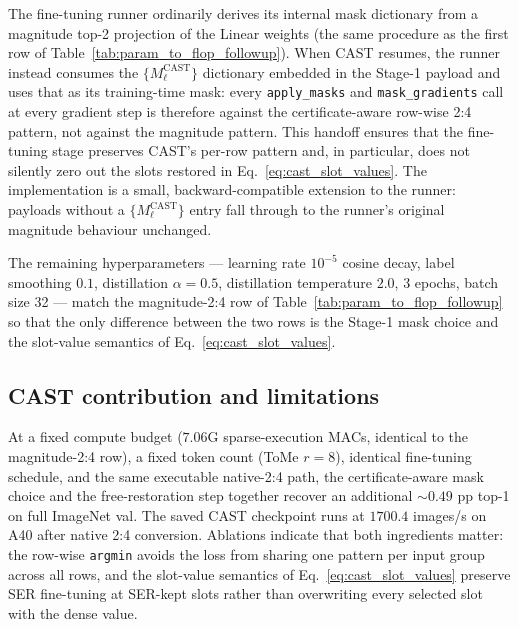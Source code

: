 \documentclass[11pt]{article}
\theoremstyle{plain}
\theoremstyle{definition}
\theoremstyle{remark}
\newcommand{\1}{\mathbf{1}}
\begin{document}
The fine-tuning runner ordinarily derives its internal mask dictionary from a magnitude top-2 projection of the Linear weights (the same procedure as the first row of Table~\ref{tab:param_to_flop_followup}).  When CAST resumes, the runner instead consumes the \(\{M^{\mathrm{CAST}}_\ell\}\) dictionary embedded in the Stage-1 payload and uses that as its training-time mask: every \texttt{apply\_masks} and \texttt{mask\_gradients} call at every gradient step is therefore against the certificate-aware row-wise 2:4 pattern, not against the magnitude pattern.  This handoff ensures that the fine-tuning stage preserves CAST's per-row pattern and, in particular, does not silently zero out the slots restored in Eq.~\eqref{eq:cast_slot_values}.  The implementation is a small, backward-compatible extension to the runner: payloads without a \(\{M^{\mathrm{CAST}}_\ell\}\) entry fall through to the runner's original magnitude behaviour unchanged.

The remaining hyperparameters --- learning rate \(10^{-5}\) cosine decay, label smoothing \(0.1\), distillation \(\alpha=0.5\), distillation temperature \(2.0\), 3 epochs, batch size 32 --- match the magnitude-2:4 row of Table~\ref{tab:param_to_flop_followup} so that the only difference between the two rows is the Stage-1 mask choice and the slot-value semantics of Eq.~\eqref{eq:cast_slot_values}.

\subsection{CAST contribution and limitations}
\label{subsec:cast_limits}

At a fixed compute budget (\(7.06\)G sparse-execution MACs, identical to the magnitude-2:4 row), a fixed token count (ToMe \(r=8\)), identical fine-tuning schedule, and the same executable native-2:4 path, the certificate-aware mask choice and the free-restoration step together recover an additional \(\sim\!0.49\) pp top-1 on full ImageNet val.  The saved CAST checkpoint runs at \(1700.4\) images/s on A40 after native 2:4 conversion. Ablations indicate that both ingredients matter: the row-wise \texttt{argmin} avoids the loss from sharing one pattern per input group across all rows, and the slot-value semantics of Eq.~\eqref{eq:cast_slot_values} preserve SER fine-tuning at SER-kept slots rather than overwriting every selected slot with the dense value.
\end{document}
